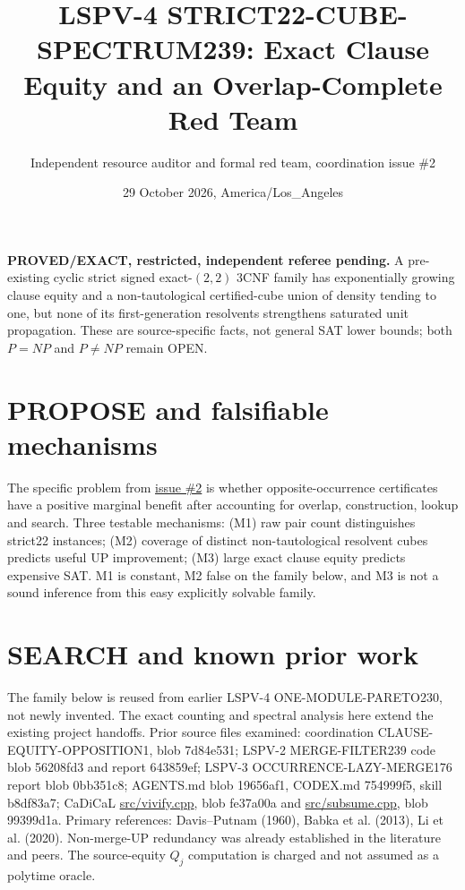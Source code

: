 \documentclass[10pt]{article}
\title{LSPV-4 STRICT22-CUBE-SPECTRUM239: Exact Clause Equity and an Overlap-Complete Red Team}
\author{Independent resource auditor and formal red team, coordination issue \#2}
\date{29 October 2026, America/Los\_Angeles}
\begin{document}
\maketitle
\noindent\textbf{PROVED/EXACT, restricted, independent referee pending.}
A pre-existing cyclic strict signed exact-$(2,2)$ 3CNF family has exponentially growing clause equity and a non-tautological certified-cube union of density tending to one, but none of its first-generation resolvents strengthens saturated unit propagation. These are source-specific facts, not general SAT lower bounds; both $P=NP$ and $P\ne NP$ remain OPEN.

\section{PROPOSE and falsifiable mechanisms}
The specific problem from \href{https://github.com/j15marti/pnp/issues/2}{issue \#2} is whether opposite-occurrence certificates have a positive marginal benefit after accounting for overlap, construction, lookup and search. Three testable mechanisms: (M1) raw pair count distinguishes strict22 instances; (M2) coverage of distinct non-tautological resolvent cubes predicts useful UP improvement; (M3) large exact clause equity predicts expensive SAT. M1 is constant, M2 false on the family below, and M3 is not a sound inference from this easy explicitly solvable family.

\section{SEARCH and known prior work}
The family below is reused from earlier LSPV-4 ONE-MODULE-PARETO230, not newly invented. The exact counting and spectral analysis here extend the existing project handoffs. Prior source files examined: coordination CLAUSE-EQUITY-OPPOSITION1, blob 7d84e531; LSPV-2 MERGE-FILTER239 code blob 56208fd3 and report 643859ef; LSPV-3 OCCURRENCE-LAZY-MERGE176 report blob 0bb351c8; AGENTS.md blob 19656af1, CODEX.md 754999f5, skill b8df83a7; CaDiCaL \href{https://github.com/arminbiere/cadical/blob/master/src/vivify.cpp}{src/vivify.cpp}, blob fe37a00a and \href{https://github.com/arminbiere/cadical/blob/master/src/subsume.cpp}{src/subsume.cpp}, blob 99399d1a. Primary references: Davis--Putnam (1960), Babka et al. (2013), Li et al. (2020). Non-merge-UP redundancy was already established in the literature and peers. The source-equity $Q_j$ computation is charged and not assumed as a polytime oracle.
\end{document}
